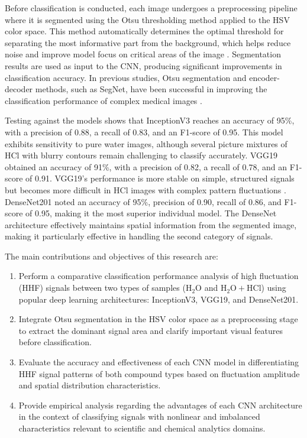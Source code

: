 \documentclass[conference]{IEEEtran}
\begin{document}
Before classification is conducted, each image undergoes a preprocessing pipeline where it is segmented using the Otsu thresholding method applied to the HSV color space. This method automatically determines the optimal threshold for separating the most informative part from the background, which helps reduce noise and improve model focus on critical areas of the image \cite{ref11, ref12}. Segmentation results are used as input to the CNN, producing significant improvements in classification accuracy. In previous studies, Otsu segmentation and encoder-decoder methods, such as SegNet, have been successful in improving the classification performance of complex medical images \cite{ref11, ref12}. 

Testing against the models shows that InceptionV3 reaches an accuracy of 95\%, with a precision of 0.88, a recall of 0.83, and an F1-score of 0.95. This model exhibits sensitivity to pure water images, although several picture mixtures of HCl with blurry contours remain challenging to classify accurately. VGG19 obtained an accuracy of 91\%, with a precision of 0.82, a recall of 0.78, and an F1-score of 0.91. VGG19's performance is more stable on simple, structured signals but becomes more difficult in HCl images with complex pattern fluctuations \cite{ref6}. DenseNet201 noted an accuracy of 95\%, precision of 0.90, recall of 0.86, and F1-score of 0.95, making it the most superior individual model. The DenseNet architecture effectively maintains spatial information from the segmented image, making it particularly effective in handling the second category of signals.

The main contributions and objectives of this research are:
\begin{enumerate}
    \item Perform a comparative classification performance analysis of high fluctuation (HHF) signals between two types of samples ($\text{H}_2\text{O}$ and $\text{H}_2\text{O} + \text{HCl}$) using popular deep learning architectures: InceptionV3, VGG19, and DenseNet201.
    \item Integrate Otsu segmentation in the HSV color space as a preprocessing stage to extract the dominant signal area and clarify important visual features before classification.
    \item Evaluate the accuracy and effectiveness of each CNN model in differentiating HHF signal patterns of both compound types based on fluctuation amplitude and spatial distribution characteristics.
    \item Provide empirical analysis regarding the advantages of each CNN architecture in the context of classifying signals with nonlinear and imbalanced characteristics relevant to scientific and chemical analytics domains.
\end{enumerate}
\end{document}
